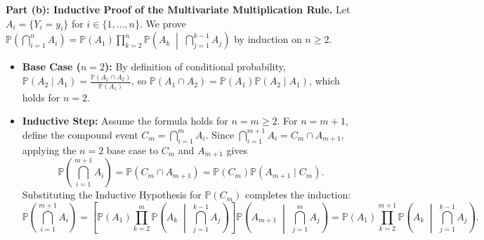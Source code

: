 \documentclass[11pt, letterpaper]{article}
\theoremstyle{definition}
\theoremstyle{remark}
\newcommand{\Prob}{\mathbb{P}}
\begin{document}
\textbf{Part (b): Inductive Proof of the Multivariate Multiplication Rule.}
Let $A_i = \{Y_i = y_i\}$ for $i \in \{1, \dots, n\}$. We prove $\Prob\left(\bigcap_{i=1}^n A_i\right) = \Prob(A_1) \prod_{k=2}^n \Prob\left(A_k \;\middle|\; \bigcap_{j=1}^{k-1} A_j\right)$ by induction on $n \ge 2$.
\begin{itemize}
    \item \textbf{Base Case ($n = 2$):} By definition of conditional probability, $\Prob(A_2 \mid A_1) = \frac{\Prob(A_1 \cap A_2)}{\Prob(A_1)}$, so $\Prob(A_1 \cap A_2) = \Prob(A_1)\Prob(A_2 \mid A_1)$, which holds for $n = 2$.
    \item \textbf{Inductive Step:} Assume the formula holds for $n = m \ge 2$. For $n = m + 1$, define the compound event $C_m = \bigcap_{i=1}^m A_i$. Since $\bigcap_{i=1}^{m+1} A_i = C_m \cap A_{m+1}$, applying the $n = 2$ base case to $C_m$ and $A_{m+1}$ gives
    \[
    \Prob\left(\bigcap_{i=1}^{m+1} A_i\right) = \Prob(C_m \cap A_{m+1}) = \Prob(C_m)\Prob(A_{m+1} \mid C_m).
    \]
    Substituting the Inductive Hypothesis for $\Prob(C_m)$ completes the induction:
    \[
    \Prob\left(\bigcap_{i=1}^{m+1} A_i\right) = \left[\Prob(A_1) \prod_{k=2}^{m} \Prob\left(A_k \;\middle|\; \bigcap_{j=1}^{k-1} A_j\right)\right] \Prob\left(A_{m+1} \;\middle|\; \bigcap_{j=1}^{m} A_j\right) = \Prob(A_1) \prod_{k=2}^{m+1} \Prob\left(A_k \;\middle|\; \bigcap_{j=1}^{k-1} A_j\right).
    \]
\end{itemize}
\end{document}
